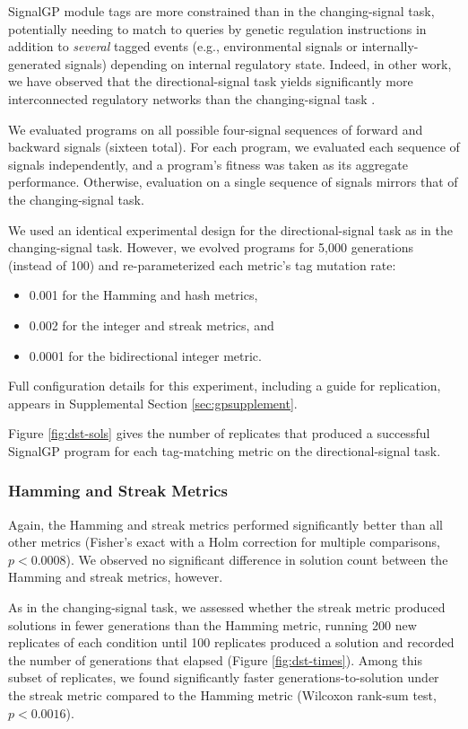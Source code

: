 SignalGP module tags are more constrained than in the changing-signal task, potentially needing to match to queries by genetic regulation instructions in addition to \textit{several} tagged events (e.g., environmental signals or internally-generated signals) depending on internal regulatory state.
Indeed, in other work, we have observed that the directional-signal task yields significantly more interconnected regulatory networks than the changing-signal task \citep{lalejini_tag-based_2021}.

We evaluated programs on all possible four-signal sequences of forward and backward signals (sixteen total).
For each program, we evaluated each sequence of signals independently, and a program's fitness was taken as its aggregate performance.
Otherwise, evaluation on a single sequence of signals mirrors that of the changing-signal task.

We used an identical experimental design for the directional-signal task as in the changing-signal task.
However, we evolved programs for 5,000 generations (instead of 100) and re-parameterized each metric's tag mutation rate:
\begin{itemize}
\item 0.001 for the Hamming and hash metrics,
\item 0.002 for the integer and streak metrics, and
\item 0.0001 for the bidirectional integer metric.
\end{itemize}
Full configuration details for this experiment, including a guide for replication, appears in Supplemental Section \ref{sec:gpsupplement}.

Figure \ref{fig:dst-sols} gives the number of replicates that produced a successful SignalGP program for each tag-matching metric on the directional-signal task.

\subsubsection{Hamming and Streak Metrics}

Again, the Hamming and streak metrics performed significantly better than all other metrics (Fisher's exact with a Holm correction for multiple comparisons, $p < 0.0008$).
We observed no significant difference in solution count between the Hamming and streak metrics, however.

As in the changing-signal task, we assessed whether the streak metric produced solutions in fewer generations than the Hamming metric, running 200 new replicates of each condition until 100 replicates produced a solution and recorded the number of generations that elapsed (Figure \ref{fig:dst-times}).
Among this subset of replicates, we found significantly faster generations-to-solution under the streak metric compared to the Hamming metric (Wilcoxon rank-sum test, $p < 0.0016$).

